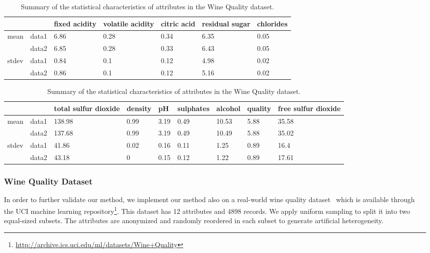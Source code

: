 \begin{table}[tbh]\footnotesize{
\begin{center}
\begin{tabular}{l|l|l|l|l|l|l}
\hline
\multicolumn{2}{c|}{}		&	fixed acidity	&	volatile acidity	&	citric acid	&	residual sugar	&	chlorides	\\
\hline
\multirow{2}{*}{mean}	&	data1	&	6.86	&	0.28	&	0.34	&	6.35	&	0.05	\\
	&	data2	&	6.85	&	0.28	&	0.33	&	6.43	&	0.05	\\
\hline
\multirow{2}{*}{stdev}	&	data1	&	0.84	&	0.1	&	0.12	&	4.98	&	0.02	\\
	&	data2	&	0.86	&	0.1	&	0.12	&	5.16	&	0.02	\\
\hline
\end{tabular}
\newline
\vspace*{.5cm}

\begin{tabular}{l|l|l|l|l|l|l|l|l}
\hline
\multicolumn{2}{c|}{}		&	total sulfur dioxide	&	density	&	pH	&	sulphates	&	alcohol	&	quality	&	free sulfur dioxide	 \\
\hline
\multirow{2}{*}{mean}	&	data1	&	138.98	&	0.99	&	3.19	&	0.49	&	10.53	&	5.88	&	35.58	\\
	&	data2	&	137.68	&	0.99	&	3.19	&	0.49	&	10.49	&	5.88	&	35.02	\\
\hline
\multirow{2}{*}{stdev}	&	data1	&	41.86	&	0.02	&	0.16	&	0.11	&	1.25	&	0.89	&	16.4	\\
	&	data2	&	43.18	&	0	&	0.15	&	0.12	&	1.22	&	0.89	&	17.61	\\
\hline
\end{tabular}
\end{center}}
\caption[Distribution of the Wine Quality dataset]{\label{tbl:wine_stat} Summary of the statistical characteristics of attributes in the Wine Quality dataset.}
\end{table}

\subsubsection{Wine Quality Dataset}
In order to further validate our method, we implement our method also on a real-world wine quality dataset~\cite{CorCer09} which is available through the UCI machine learning repository\footnote[1]{\url{http://archive.ics.uci.edu/ml/datasets/Wine+Quality}}. This dataset has 12 attributes and 4898 records. We apply uniform sampling to split it into two equal-sized subsets. The attributes are anonymized and randomly reordered in each subset to generate artificial heterogeneity.

